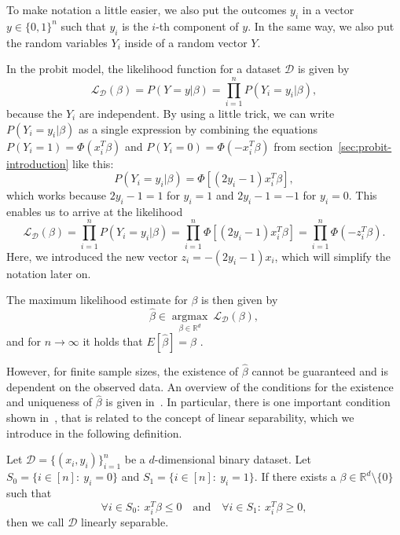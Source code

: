 To make notation a little easier, we also put the outcomes $y_i$
in a vector $y \in \{0, 1\}^n$ such that $y_i$ is the $i$-th
component of $y$. In the same way, we also put the random
variables $Y_i$ inside of a random vector $Y$.

In the probit model, the likelihood function for a
dataset $\mathcal{D}$ is given by
\begin{equation}
    \label{eq:likelihood}
    \mathcal{L}_\mathcal{D}(\beta) = P(Y=y | \beta) = \prod_{i=1}^n P(Y_i=y_i | \beta),
\end{equation}
because the $Y_i$ are independent. By using a little trick, we can
write $P(Y_i=y_i|\beta)$ as a single expression by combining
the equations $P(Y_i=1) = \Phi(x_i^T \beta)$ and
$P(Y_i=0) = \Phi(-x_i^T \beta)$ from section~\ref{sec:probit-introduction}
like this:
\begin{equation*}
    P(Y_i = y_i | \beta) = \Phi[(2y_i - 1) x_i^T \beta],
\end{equation*}
which works because $2y_i-1=1$ for $y_i=1$ and $2y_i-1=-1$ for $y_i=0$.
This enables us to arrive at the likelihood
\begin{equation}
    \mathcal{L}_\mathcal{D}(\beta) = \prod_{i=1}^n P(Y_i=y_i | \beta)
    = \prod_{i=1}^n \Phi[(2y_i - 1) x_i^T \beta]
    = \prod_{i=1}^n \Phi(- z_i^T \beta).
\end{equation}
Here, we introduced the new vector $z_i = - (2y_i - 1) x_i$, which will
simplify the notation later on.

The maximum likelihood estimate for $\beta$ is then given by
\begin{equation}
    \label{eq:maximum-likelihood-estimate}
    \hat{\beta} \in \underset{\beta \in \mathbb{R}^d}{\operatorname{argmax}}\
    \mathcal{L}_\mathcal{D}(\beta),
\end{equation}
and for $n \rightarrow \infty$ it holds that
$E[\hat{\beta}] = \beta$ \cite{regression-fahrmeir}.

However, for finite sample sizes, the existence of $\hat{\beta}$
cannot be guaranteed and is dependent on the observed data.
An overview of the conditions for the existence and uniqueness of
$\hat{\beta}$ is given in~\cite{probit-computational}.
In particular, there is one important condition shown
in~\cite{probit-existence}, that is related to the concept of
linear separability, which we introduce in the following definition.
\begin{definition}
    \label{def:linear-separability}
    Let $\mathcal{D}=\{(x_i, y_i)\}_{i=1}^n$ be a $d$-dimensional
    binary dataset.
    Let $S_0 = \{i \in [n]:\ y_i = 0\}$ and $S_1 = \{i \in [n]:\ y_i = 1\}$.
    If there exists a $\beta \in \mathbb{R}^d \setminus \{0\}$ such that
    \begin{equation*}
        \forall i \in S_0:\ x_i^T \beta \leq 0\quad \text{and}\quad \forall i \in S_1:\ x_i^T \beta \geq 0,
    \end{equation*}
    then we call $\mathcal{D}$ linearly separable.
\end{definition}

